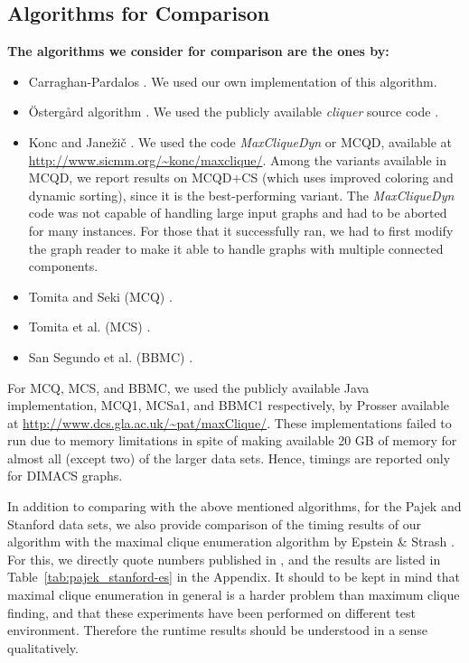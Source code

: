 \subsection{Algorithms for Comparison}
{\bf The algorithms we consider for comparison are the ones by: 
\begin{itemize}
\item Carraghan-Pardalos \cite{pardalos}. We used our own implementation of this algorithm.
\item \"{O}sterg{\aa}rd algorithm \cite{ostergard}. We used the publicly available {\it cliquer} source code \cite{cliquer}.
\item Konc and Jane\v{z}i\v{c} \cite{konc2007improved}. We used the code {\it MaxCliqueDyn} or MCQD, available at \\{\small \url{http://www.sicmm.org/~konc/maxclique/}}. Among the variants available in MCQD, we report results on MCQD+CS (which uses improved coloring and dynamic sorting), since it is the best-performing variant. The {\it MaxCliqueDyn} code was not capable of handling large input graphs and had to be aborted for many instances. For those that it successfully ran, we had to first modify the graph reader to make it able to handle graphs with multiple connected components.
\item Tomita and Seki (MCQ) \cite{citeulike:7905505}.
\item Tomita et al. (MCS) \cite{walcom}.
\item San Segundo et al. (BBMC) \cite{SanSegundo}.
\end{itemize}
For MCQ, MCS, and BBMC, we used the publicly available Java implementation, MCQ1, MCSa1, and BBMC1 respectively, by Prosser \cite{prosser2012}  available at {\small \url{http://www.dcs.gla.ac.uk/~pat/maxClique/}}. These implementations failed to run due to memory limitations in spite of making available 20 GB of memory for almost all (except two) of the larger data sets. Hence, timings are reported only for DIMACS graphs. 

In addition to comparing with the above mentioned algorithms, for the Pajek and Stanford data sets, we also provide comparison of the timing results of our algorithm with the maximal clique enumeration algorithm by Epstein \& Strash \cite{sea}. For this, we directly quote numbers published in \cite{sea}, and the results are listed in Table~\ref{tab:pajek_stanford-es} in the Appendix.
It should to be kept in mind that maximal clique enumeration in general is a harder problem than maximum clique finding, and that these experiments have been performed on different test environment. Therefore the runtime results should be understood in a sense qualitatively.
}

